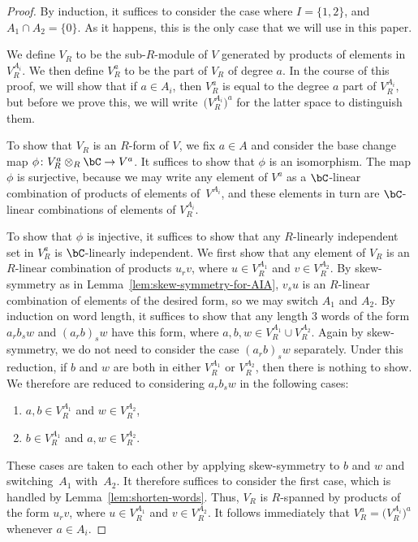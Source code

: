 \begin{proof}By induction, it suffices to consider the case where $I = \{1,2\}$, and $A_1 \cap A_2 = \{0\}$. As it happens, this is the only case that we will use in this paper.

We define $V_R$ to be the sub-$R$-module of $V$ generated by products of elements in $V^{A_i}_R$. We then define $V^a_R$ to be the part of $V_R$ of degree $a$. In the course of this proof, we will show that if $a \in A_i$, then $V^a_R$ is equal to the degree $a$ part of $V^{A_i}_R$, but before we prove this, we will write~$\big(V^{A_i}_R\big)^a$ for the latter space to distinguish them.

To show that $V_R$ is an $R$-form of $V$, we fix $a \in A$ and consider the base change map $\phi\colon V^a_R \otimes_{R} \bC \to V^a$. It suffices to show that $\phi$ is an isomorphism. The map $\phi$ is surjective, because we may write any element of $V^a$ as a $\bC$-linear combination of products of elements of~$V^{A_i}$, and these elements in turn are $\bC$-linear combinations of elements of $V^{A_i}_R$.

To show that $\phi$ is injective, it suffices to show that any $R$-linearly independent set in $V^a_R$ is $\bC$-linearly independent. We first show that any element of $V_R$ is an $R$-linear combination of products $u_r v$, where $u \in V^{A_1}_R$ and $v \in V^{A_2}_R$. By skew-symmetry as in Lemma~\ref{lem:skew-symmetry-for-AIA}, $v_s u$ is an $R$-linear combination of elements of the desired form, so we may switch $A_1$ and $A_2$. By induction on word length, it suffices to show that any length 3 words of the form $a_r b_s w$ and $(a_r b)_s w$ have this form, where $a,b,w \in V^{A_1}_R \cup V^{A_2}_R$. Again by skew-symmetry, we do not need to consider the case $(a_r b)_s w$ separately. Under this reduction, if $b$ and $w$ are both in either $V^{A_1}_R$ or $V^{A_2}_R$, then there is nothing to show. We therefore are reduced to considering $a_r b_s w$ in the following cases:
\begin{enumerate}\itemsep=0pt
\item[1)] $a,b \in V^{A_1}_R$ and $w \in V^{A_2}_R$,
\item[2)] $b \in V^{A_1}_R$ and $a, w \in V^{A_2}_R$.
\end{enumerate}
These cases are taken to each other by applying skew-symmetry to $b$ and $w$ and swit\-ching~$A_1$ with~$A_2$. It therefore suffices to consider the first case, which is handled by Lemma~\ref{lem:shorten-words}. Thus, $V_R$ is $R$-spanned by products of the form $u_r v$, where $u \in V^{A_1}_R$ and $v \in V^{A_2}_R$. It follows immediately that $V^a_R = \big(V^{A_i}_R\big)^a$ whenever $a \in A_i$.


\end{proof}
